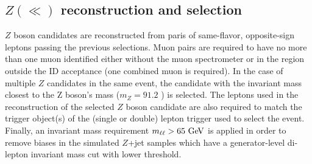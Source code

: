 \subsection{$Z(\ll)$ reconstruction and selection}
$Z$ boson candidates are reconstructed from paris of same-flavor, opposite-sign
leptons passing the previous selections. Muon pairs are required to have no more
than one muon identified either without the muon spectrometer or in the region
outside the ID acceptance (one combined muon is required). In the case of
multiple $Z$ candidates in the same event, the candidate with the invariant
mass closest to the Z boson's mass ($m_Z = 91.2$ \cite{Beringer:1900zz}) is selected.
The leptons used in the reconstruction of the selected $Z$ boson candidate are also
required to match the trigger object(s) of the (single or double) lepton trigger
used to select the event. Finally, an invariant mass requirement $\mass\ell > 65 \GeV$
is applied in order to remove biases in the simulated $Z$+jet samples which have a 
generator-level di-lepton invariant mass cut with lower threshold.

